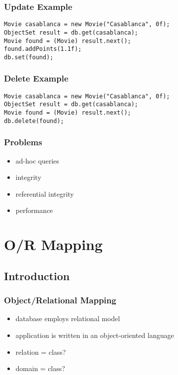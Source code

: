\documentclass[dvipsnames]{beamer}
\theoremstyle{plain}
\begin{document}
\begin{frame}[fragile]
  \frametitle{Update Example}

  \begin{example}
    \begin{lstlisting}
Movie casablanca = new Movie("Casablanca", 0f);
ObjectSet result = db.get(casablanca);
Movie found = (Movie) result.next();
found.addPoints(1.1f);
db.set(found);
    \end{lstlisting}
  \end{example}
\end{frame}

\begin{frame}[fragile]
  \frametitle{Delete Example}

  \begin{example}
    \begin{lstlisting}
Movie casablanca = new Movie("Casablanca", 0f);
ObjectSet result = db.get(casablanca);
Movie found = (Movie) result.next();
db.delete(found);
    \end{lstlisting}
  \end{example}
\end{frame}

\begin{frame}
  \frametitle{Problems}

  \begin{itemize}
    \item ad-hoc queries
    \item integrity
    \item referential integrity
    \item performance
  \end{itemize}
\end{frame}

\section{O/R Mapping}

\subsection{Introduction}

\begin{frame}
  \frametitle{Object/Relational Mapping}

  \begin{itemize}
    \item database employs relational model
    \item application is written in an object-oriented language

    \pause
    \item relation = class?
    \item domain = class?
  \end{itemize}
\end{frame}
\end{document}
